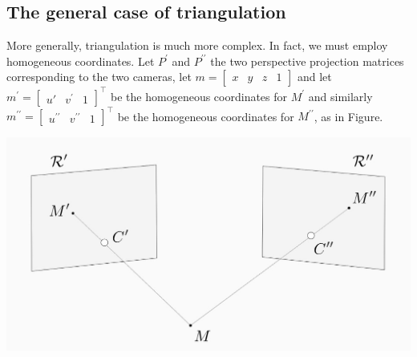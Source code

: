 \documentclass[10pt]{report}
\begin{document}
\subsection{The general case of triangulation}
\label{sec:org46f43ea}
More generally, triangulation is much more complex. In fact, we must employ homogeneous coordinates. Let \(P^\prime\) and \(P^{\prime\prime}\) the two perspective projection matrices corresponding to the two cameras, let \(m = \begin{bmatrix} x & y & z & 1\end{bmatrix}\) and let \(m^\prime = \begin{bmatrix}u\prime & v^\prime & 1\end{bmatrix}^\top\) be the homogeneous coordinates for \(M^\prime\) and similarly \(m^{\prime\prime} = \begin{bmatrix}u^{\prime\prime} & v^{\prime\prime} & 1\end{bmatrix}^\top\) be the homogeneous coordinates for \(M^{\prime\prime}\), as in Figure.

\begin{center}
\includegraphics[width=.9\linewidth]{./pics/stereo/triangulation2.jpg}
\end{center}
\end{document}

